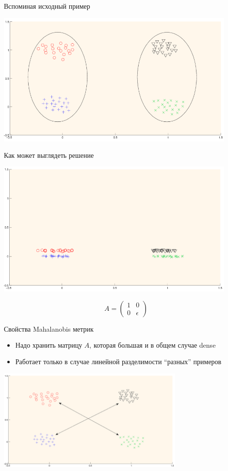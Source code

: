 \documentclass[14pt, fleqn, xcolor={dvipsnames, table}]{beamer}
\begin{document}
\begin{frame}{Вспоминая исходный пример}
\begin{center}
\includegraphics[width=0.9\textwidth]{linsep-setup2.png}
\end{center}
\end{frame}

\begin{frame}{Как может выглядеть решение}
\begin{center}
\includegraphics[width=0.9\textwidth]{linsep-solution.png}
\end{center}
$$
A = \left(\begin{array}{cc}
1 & 0 \\
0 & \epsilon
\end{array}\right)
$$
\end{frame}

\begin{frame}{Свойства Mahalanobis метрик}
\begin{itemize}
  \item Надо хранить матрицу $A$, которая большая и в общем случае dense
  \item Работает только в случае линейной разделимости ``разных'' примеров
\end{itemize}
\begin{center}
\includegraphics[width=0.7\textwidth]{linnonsep.png}
\end{center}
\end{frame}
\end{document}
